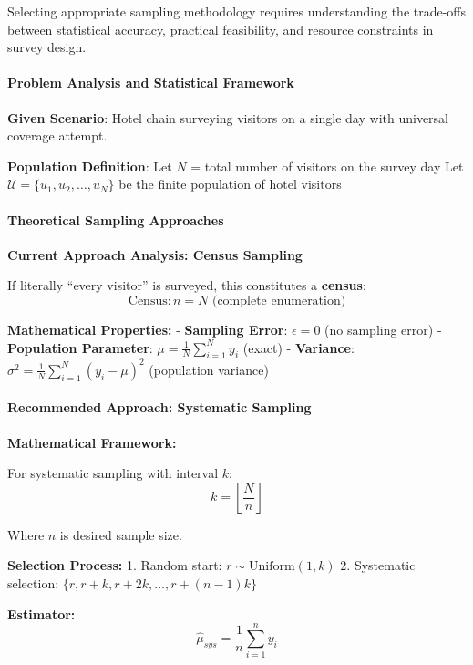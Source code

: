 \documentclass[11pt]{article}
\begin{document}
Selecting appropriate sampling methodology requires understanding the
trade-offs between statistical accuracy, practical feasibility, and
resource constraints in survey design.

\paragraph{Problem Analysis and Statistical
Framework}\label{problem-analysis-and-statistical-framework}

\textbf{Given Scenario}: Hotel chain surveying visitors on a single day
with universal coverage attempt.

\textbf{Population Definition}: Let \(N\) = total number of visitors on
the survey day Let \(\mathcal{U} = \{u_1, u_2, \ldots, u_N\}\) be the
finite population of hotel visitors

\paragraph{Theoretical Sampling
Approaches}\label{theoretical-sampling-approaches}

\textbf{Current Approach Analysis: Census Sampling}

If literally ``every visitor'' is surveyed, this constitutes a
\textbf{census}: \[\text{Census}: n = N \text{ (complete enumeration)}\]

\textbf{Mathematical Properties:} - \textbf{Sampling Error}:
\(\epsilon = 0\) (no sampling error) - \textbf{Population Parameter}:
\(\mu = \frac{1}{N}\sum_{i=1}^{N} y_i\) (exact) - \textbf{Variance}:
\(\sigma^2 = \frac{1}{N}\sum_{i=1}^{N} (y_i - \mu)^2\) (population
variance)

\paragraph{Recommended Approach: Systematic
Sampling}\label{recommended-approach-systematic-sampling}

\textbf{Mathematical Framework:}

For systematic sampling with interval \(k\):
\[k = \left\lfloor \frac{N}{n} \right\rfloor\]

Where \(n\) is desired sample size.

\textbf{Selection Process:} 1. Random start:
\(r \sim \text{Uniform}(1, k)\) 2. Systematic selection:
\(\{r, r+k, r+2k, \ldots, r+(n-1)k\}\)

\textbf{Estimator:} \[\hat{\mu}_{sys} = \frac{1}{n}\sum_{i=1}^{n} y_i\]
\end{document}
